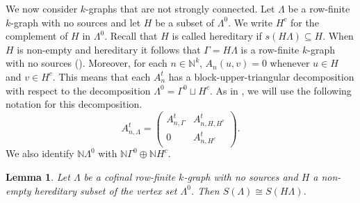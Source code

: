 \documentclass[a4paper, 12pt]{amsart}
\numberwithin{equation}{section}
\newcounter{theorem}
\newtheorem{lemma}[theorem]{Lemma}
\theoremstyle{remark}
\theoremstyle{definition}
\begin{document}
We now consider $k$-graphs that are not strongly connected. Let $\Lambda$ be a row-finite
$k$-graph with no sources and let $H$ be a subset of $\Lambda^0$. We write $H^c$ for the
complement of $H$ in $\Lambda^0$. Recall that $H$ is called hereditary if
$s(H\Lambda)\subseteq H$. When $H$ is non-empty and hereditary it follows that
$\Gamma=H\Lambda$ is a row-finite $k$-graph with no sources (\cite[p.~114]{MR1961175}).
Moreover, for each $n\in {\mathbb{N}}^k$, $A_n(u,v)=0$ whenever $u\in H$ and $v\in H^c$. This
means that each $A^t_n$ has a block-upper-triangular decomposition with respect to the
decomposition $\Lambda^0=\Gamma^0 \sqcup H^c$. As in \cite{PasSieSim}, we will use the
following notation for this decomposition.
\begin{equation}\label{eq.matrix}
A^t_{n,\Lambda} = \left(
\begin{array}{cc}
A^t_{n,\Gamma} & A^t_{n,H,H^c} \\
0 & A^t_{n,H^c}
\end{array}
 \right).
\end{equation}
We also identify ${\mathbb{N}}\Lambda^0$ with ${\mathbb{N}}\Gamma^0\oplus {\mathbb{N}} H^c$.

\begin{lemma}\label{lem.hereditary}
Let $\Lambda$ be a cofinal row-finite $k$-graph with no sources and $H$ a non-empty
hereditary subset of the vertex set $\Lambda^0$. Then $S(\Lambda)\cong S(H\Lambda)$.
\end{lemma}
\end{document}
